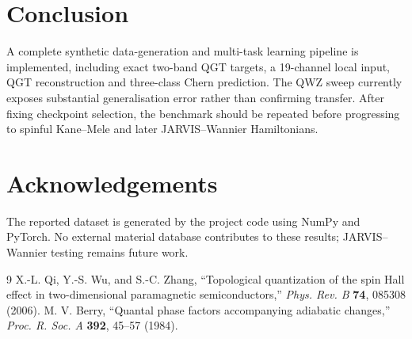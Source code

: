 \documentclass[10pt,twocolumn]{article}
\begin{document}
\section{Conclusion}
A complete synthetic data-generation and multi-task learning pipeline is implemented, including exact two-band QGT targets, a 19-channel local input, QGT reconstruction and three-class Chern prediction. The QWZ sweep currently exposes substantial generalisation error rather than confirming transfer. After fixing checkpoint selection, the benchmark should be repeated before progressing to spinful Kane--Mele and later JARVIS--Wannier Hamiltonians.

\section*{Acknowledgements}
The reported dataset is generated by the project code using NumPy and PyTorch. No external material database contributes to these results; JARVIS--Wannier testing remains future work.

\begin{thebibliography}{9}
\setlength{\itemsep}{0pt}
 X.-L. Qi, Y.-S. Wu, and S.-C. Zhang, ``Topological quantization of the spin Hall effect in two-dimensional paramagnetic semiconductors,'' \textit{Phys. Rev. B} \textbf{74}, 085308 (2006).
 M. V. Berry, ``Quantal phase factors accompanying adiabatic changes,'' \textit{Proc. R. Soc. A} \textbf{392}, 45--57 (1984).
\end{thebibliography}
\end{document}
